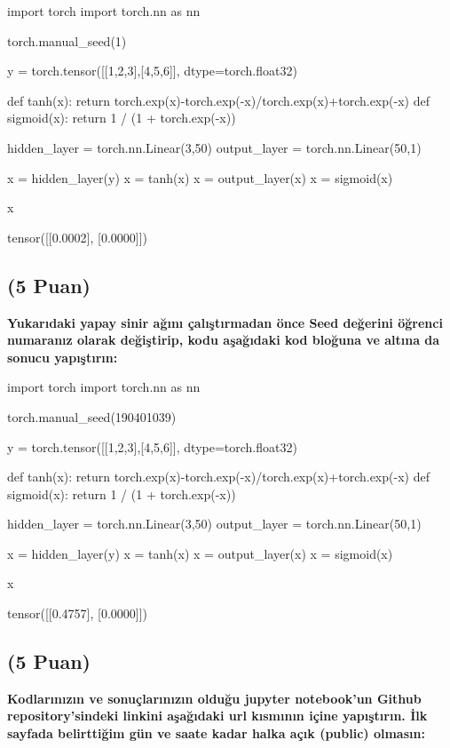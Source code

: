 \documentclass[11pt]{article}
\begin{document}
\begin{itemize}
\begin{itemize}
\begin{python}
import torch
import torch.nn as nn

torch.manual_seed(1)

y = torch.tensor([[1,2,3],[4,5,6]], dtype=torch.float32)

def tanh(x):
  return torch.exp(x)-torch.exp(-x)/torch.exp(x)+torch.exp(-x)
def sigmoid(x):
   return 1 / (1 + torch.exp(-x))


hidden_layer = torch.nn.Linear(3,50)
output_layer = torch.nn.Linear(50,1)

x = hidden_layer(y)
x = tanh(x)
x = output_layer(x)
x = sigmoid(x)

x
\end{python}

tensor([[0.0002],
        [0.0000]])

\subsection{(5 Puan)} \textbf{Yukarıdaki yapay sinir ağını çalıştırmadan önce Seed değerini öğrenci numaranız olarak değiştirip, kodu aşağıdaki kod bloğuna ve altına da sonucu yapıştırın:}

\begin{python}
import torch
import torch.nn as nn

torch.manual_seed(190401039)

y = torch.tensor([[1,2,3],[4,5,6]], dtype=torch.float32)

def tanh(x):
  return torch.exp(x)-torch.exp(-x)/torch.exp(x)+torch.exp(-x)
def sigmoid(x):
   return 1 / (1 + torch.exp(-x))


hidden_layer = torch.nn.Linear(3,50)
output_layer = torch.nn.Linear(50,1)

x = hidden_layer(y)
x = tanh(x)
x = output_layer(x)
x = sigmoid(x)

x
\end{python}

tensor([[0.4757],
        [0.0000]])

\subsection{(5 Puan)} \textbf{Kodlarınızın ve sonuçlarınızın olduğu jupyter notebook'un Github repository'sindeki linkini aşağıdaki url kısmının içine yapıştırın. İlk sayfada belirttiğim gün ve saate kadar halka açık (public) olmasın:}


\end{itemize}
\end{itemize}
\end{document}
